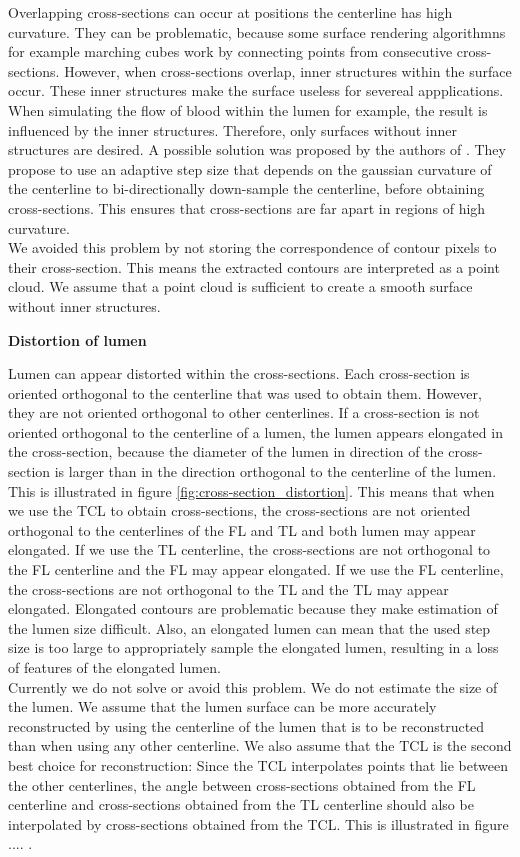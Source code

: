 \documentclass[thesis.tex]{subfiles}
\begin{document}
Overlapping cross-sections can occur at positions the centerline has high curvature. They can be problematic, because some surface rendering algorithmns for example marching cubes work by connecting points from consecutive cross-sections. However, when cross-sections overlap, inner structures within the surface occur. These inner structures make the surface useless for severeal appplications. When simulating the flow of blood within the lumen for example, the result is influenced by the inner structures. Therefore, only surfaces without inner structures are desired. A possible solution was proposed by the authors of \cite{wu2010curvature}. They propose to use an adaptive step size that depends on the gaussian curvature of the centerline to bi-directionally down-sample the centerline, before obtaining cross-sections. This ensures that cross-sections are far apart in regions of high curvature. \\
We avoided this problem by not storing the correspondence of contour pixels to their cross-section. This means the extracted contours are interpreted as a point cloud. We assume that a point cloud is sufficient to create a smooth surface without inner structures.  

\textbf{Distortion of lumen} 

Lumen can appear distorted within the cross-sections. Each cross-section is oriented orthogonal to the centerline that was used to obtain them. However, they are not oriented orthogonal to other centerlines. If a cross-section is not oriented orthogonal to the centerline of a lumen, the lumen appears elongated in the cross-section, because the diameter of the lumen in direction of the cross-section is larger than in the direction orthogonal to the centerline of the lumen. This is illustrated in figure \ref{fig:cross-section_distortion}. This means that when we use the TCL to obtain cross-sections, the cross-sections are not oriented orthogonal to the centerlines of the FL and TL and both lumen may appear elongated. If we use the TL centerline, the cross-sections are not orthogonal to the FL centerline and the FL may appear elongated. If we use the FL centerline, the cross-sections are not orthogonal to the TL and the TL may appear elongated. Elongated contours are problematic because they make estimation of the lumen size difficult. Also, an elongated lumen can mean that the used step size is too large to appropriately sample the elongated lumen, resulting in a loss of features of the elongated lumen. \\ Currently we do not solve or avoid this problem. We do not estimate the size of the lumen. We assume that the lumen surface can be more accurately reconstructed by using the centerline of the lumen that is to be reconstructed than when using any other centerline. We also assume that the TCL is the second best choice for reconstruction: Since the TCL interpolates points that lie between the other centerlines, the angle between cross-sections obtained from the FL centerline and cross-sections obtained from the TL centerline should also be interpolated by cross-sections obtained from the TCL. This is illustrated in figure .... .
\end{document}
